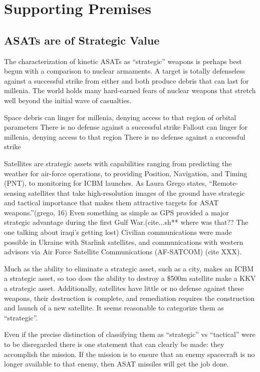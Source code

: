 \section{Supporting Premises}

\subsection{ASATs are of Strategic Value}

The characterization of kinetic ASATs as ``strategic'' weapons is
perhaps best begun with a comparison to nuclear armaments.  A target
is totally defenseless against a successful strike from either and
both produce debris that can last for millenia.  The world holds many
hard-earned fears of nuclear weapons that stretch well beyond the
initial wave of casualties.


Space debris can linger for millenia, denying access to that region of
orbital parameters There is no defense against a successful strike
Fallout can linger for millenia, denying access to that region There
is no defense against a successful strike

Satellites are strategic assets with capabilities ranging from
predicting the weather for air-force operations, to providing
Position, Navigation, and Timing (PNT), to monitoring for ICBM
launches.  As Laura Grego states, ``Remote-sensing satellites that
take high-resolution images of the ground have strategic and tactical
importance that makes them attractive targets for ASAT
weapons.''(grego, 16) Even something as simple as GPS provided a major
strategic advantage during the first Gulf War.(cite...sh** where was
that?? The one talking about iraqi's getting lost) Civilian
communications were made possible in Ukraine with Starlink satellites,
and communications with western advisors via Air Force Satellite
Communications (AF-SATCOM) (cite XXX).

Much as the ability to eliminate a strategic asset, such as a city,
makes an ICBM a strategic asset, so too does the ability to destroy a
$\$$500m satellite make a KKV a strategic asset.  Additionally,
satellites have little or no defense against these weapons, their
destruction is complete, and remediation requires the construction and
launch of a new satellite.  It seems reasonable to categorize them as
``strategic''.

Even if the precise distinction of classifying them as ``strategic''
vs ``tactical'' were to be disregarded there is one statement that can
clearly be made: they accomplish the mission.  If the mission is to
ensure that an enemy spacecraft is no longer available to that enemy,
then ASAT missiles will get the job done.

